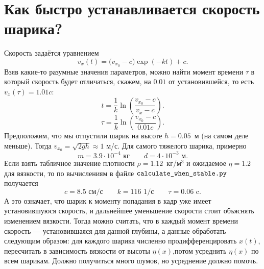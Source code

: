 \documentclass[a4paper, 12pt]{article}
\begin{document}
\section*{Как быстро устанавливается скорость шарика?}
Скорость задаётся уравнением
\[ v_x(t) = \bigl(v_{x_0} -  c\bigr)\exp(-kt) + c .\] 
Взяв какие-то разумные значения параметров, можно найти момент времени $\tau$ в который скорость будет отличаться, скажем, на $0.01$ от установившейся, то есть $v_x(\tau) = 1.01 c$:
\[ t = \frac{1}{k} \ln(\frac{v_{x_0} -  c}{v_x -  c}) .\]
\[ \tau = \frac{1}{k} \ln(\frac{v_{x_0} -  c}{0.01c}) .\]
Предположим, что мы отпустили шарик на высоте $h = 0.05$~м (на самом деле меньше).
Тогда $v_{x_0} = \sqrt{2gh} \approx 1$ м/с.
Для самого тяжелого шарика, примерно
\[ m = 3.9 \cdot 10^{-4} \text{ кг} \qquad d = 4 \cdot 10^{-3} \text{ м} .\]
Если взять табличное значение плотности $\rho = 1.12$~кг/м$^3$ и ожидаемое $\eta = 1.2$ для вязкости, то по вычислениям в файле $\verb|calculate_when_stable.py|$ получается
\[ c = 8.5 \text{ см/с} \qquad k = 116 \text{ 1/с} \qquad \tau = 0.06 \text{ c} .\]
А это означает, что шарик к моменту попадания в кадр уже имеет установившуюся скорость, и дальнейшее уменьшение скорости стоит объяснять изменением вязкости.
Тогда можно считать, что в каждый момент времени скорость --- установившаяся для данной глубины, а данные обработать следующим образом: для каждого шарика численно продифференцировать $x(t)$, пересчитать в зависимость вязкости от высоты $\eta(x)$,потом усреднить $\eta(x)$ по всем шарикам.
Должно получиться много шумов, но усреднение должно помочь.
\end{document}
